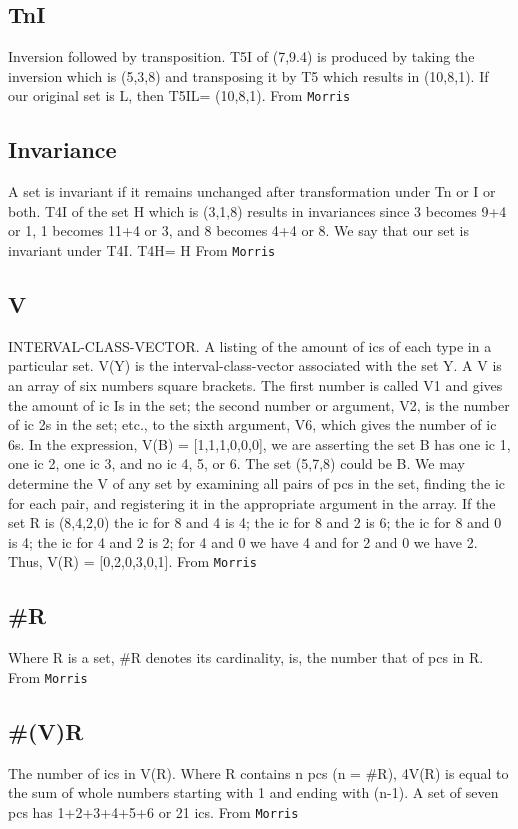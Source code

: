 \documentclass[11pt]{article}
\begin{document}
{{\subsection{TnI}
\label{sec-21-7}
Inversion followed by transposition. T5I of (7,9.4) is produced by
taking the inversion which is (5,3,8) and transposing it by T5 which
results in (10,8,1). If our original set is L, then T5IL= (10,8,1).
From \texttt{Morris}

\subsection{Invariance}
\label{sec-21-8}
A set is invariant if it remains unchanged after transformation under
Tn or I or both. T4I of the set H which is (3,1,8) results in
invariances since 3 becomes 9+4 or 1, 1 becomes 11+4 or 3, and 8
becomes 4+4 or 8. We say that our set is invariant under T4I. T4H= H
From \texttt{Morris}

\subsection{V}
\label{sec-21-9}
INTERVAL-CLASS-VECTOR. A listing of the amount of ics of each type in
a particular set. V(Y) is the interval-class-vector associated with
the set Y. A V is an array of six numbers square brackets. The first
number is called V1 and gives the amount of ic Is in the set; the
second number or argument, V2, is the number of ic 2s in the set;
etc., to the sixth argument, V6, which gives the number of ic 6s. In
the expression, V(B) = [1,1,1,0,0,0], we are asserting the set B has
one ic 1, one ic 2, one ic 3, and no ic 4, 5, or 6. The set (5,7,8)
could be B. We may determine the V of any set by examining all pairs
of pcs in the set, finding the ic for each pair, and registering it in
the appropriate argument in the array. If the set R is (8,4,2,0) the
ic for 8 and 4 is 4; the ic for 8 and 2 is 6; the ic for 8 and 0 is 4;
the ic for 4 and 2 is 2; for 4 and 0 we have 4 and for 2 and 0 we
have 2. Thus, V(R) = [0,2,0,3,0,1].  From \texttt{Morris}

\subsection{\#R}
\label{sec-21-10}
Where R is a set, \#R denotes its cardinality, is, the number that of
pcs in R.  From \texttt{Morris}

\subsection{\#(V)R}
\label{sec-21-11}
The number of ics in V(R). Where R contains n pcs (n = \#R), 4V(R) is
equal to the sum of whole numbers starting with 1 and ending with
(n-1). A set of seven pcs has 1+2+3+4+5+6 or 21 ics.  From \texttt{Morris}

}}
\end{document}
